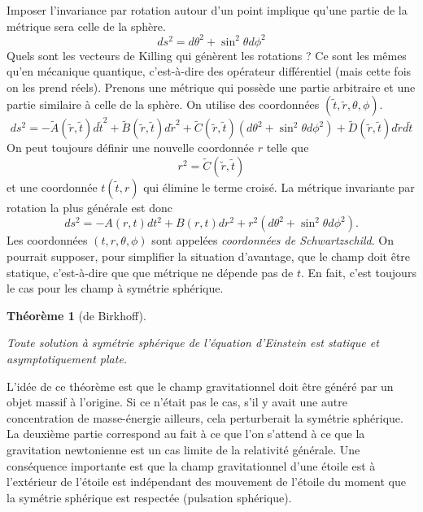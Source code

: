 \documentclass[a4paper,11pt]{report}
\theoremstyle{definition}
\theoremstyle{plain}
\newtheorem{thm}{Théorème}[chapter]
\theoremstyle{definition}
\theoremstyle{remark}
\begin{document}
        Imposer l'invariance par rotation autour d'un point implique qu'une partie de la métrique sera celle de la sphère.
        \begin{equation}
            ds^2 = d\theta^2+\sin^2\theta d\phi^2
        \end{equation}
        Quels sont les vecteurs de Killing qui génèrent les rotations ? Ce sont les mêmes qu'en mécanique quantique, c'est-à-dire des opérateur différentiel (mais cette fois on les prend réels). Prenons une métrique qui possède une partie arbitraire et une partie similaire à celle de la sphère. On utilise des coordonnées $(\tilde{t},\tilde{r},\theta,\phi)$.
        \begin{equation}
            ds^2 = -\tilde{A}(\tilde{r},\tilde{t}) d\tilde{t}^2+\tilde{B}(\tilde{r},\tilde{t}) d\tilde{r}^2 + \tilde{C}(\tilde{r},\tilde{t}) (d\theta^2+\sin^2\theta d\phi^2)+\tilde{D}(\tilde{r},\tilde{t}) d\tilde{r}d\tilde{t}
        \end{equation}
        On peut toujours définir une nouvelle coordonnée $r$ telle que
        \begin{equation}
            r^2 = \tilde{C}(\tilde{r},\tilde{t})
        \end{equation}
        et une coordonnée $t(\tilde{t},r)$ qui élimine le terme croisé. La métrique invariante par rotation la plus générale est donc
        \begin{equation}
            ds^2 = -A(r,t)dt^2+B(r,t)dr^2+r^2(d\theta^2+\sin^2\theta d\phi^2).
        \end{equation}
        Les coordonnées $(t,r,\theta,\phi)$ sont appelées \textit{coordonnées de Schwartzschild}. On pourrait supposer, pour simplifier la situation d'avantage, que le champ doit être statique, c'est-à-dire que que métrique ne dépende pas de $t$. En fait, c'est toujours le cas pour les champ à symétrie sphérique.
        
        \begin{thm}[de Birkhoff]\begin{leftbar}
            Toute solution à symétrie sphérique de l'équation d'Einstein est statique et asymptotiquement plate.
        \end{leftbar}\end{thm}
        
        L'idée de ce théorème est que le champ gravitationnel doit être généré par un objet massif à l'origine. Si ce n'était pas le cas, s'il y avait une autre concentration de masse-énergie ailleurs, cela perturberait la symétrie sphérique. La deuxième partie correspond au fait à ce que l'on s'attend à ce que la gravitation newtonienne est un cas limite de la relativité générale. Une conséquence importante est que la champ gravitationnel d'une étoile est à l'extérieur de l'étoile est indépendant des mouvement de l'étoile du moment que la symétrie sphérique est respectée (pulsation sphérique).\\
        
\end{document}
